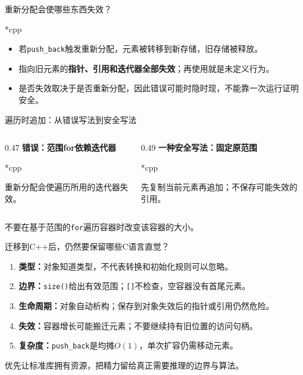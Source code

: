 \begin{frame}{重新分配会使哪些东西失效？}
\begin{Code}*{cpp}\end{Code}
\begin{itemize}
\item 若\texttt{push\_back}触发重新分配，元素被转移到新存储，旧存储被释放。
\item 指向旧元素的\textbf{指针、引用和迭代器全部失效}；再使用就是未定义行为。
\item 是否失效取决于是否重新分配，因此错误可能时隐时现，不能靠一次运行证明安全。
\end{itemize}
\end{frame}

\begin{frame}{遍历时追加：从错误写法到安全写法}
\begin{columns}[T]
\begin{column}{0.47\textwidth}
\textbf{错误：范围for依赖迭代器}
\begin{Code}*{cpp}\end{Code}
重新分配会使遍历所用的迭代器失效。
\end{column}
\begin{column}{0.49\textwidth}
\textbf{一种安全写法：固定原范围}
\begin{Code}*{cpp}\end{Code}
先复制当前元素再追加；不保存可能失效的引用。
\end{column}
\end{columns}
\medskip
\alert{不要在基于范围的\texttt{for}遍历容器时改变该容器的大小。}
\end{frame}

\begin{frame}{迁移到C++后，仍然要保留哪些C语言直觉？}
\begin{enumerate}
\item \textbf{类型：}对象知道类型，不代表转换和初始化规则可以忽略。
\item \textbf{边界：}\texttt{size()}给出有效范围；\texttt{[]}不检查，空容器没有首尾元素。
\item \textbf{生命周期：}对象自动析构；保存到对象失效后的指针或引用仍然危险。
\item \textbf{失效：}容器增长可能搬迁元素；不要继续持有旧位置的访问句柄。
\item \textbf{复杂度：}\texttt{push\_back}是均摊$O(1)$，单次扩容仍需移动元素。
\end{enumerate}
\medskip
\alert{优先让标准库拥有资源，把精力留给真正需要推理的边界与算法。}
\end{frame}
